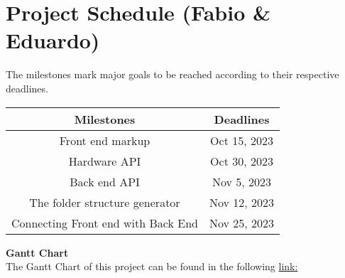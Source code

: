  \section{Project Schedule (Fabio \& Eduardo)}
 The milestones mark major goals to be reached according to their respective deadlines.
\begin{table}[H]
    \centering
    \begin{tabular}{||c | c||} 
        \hline
        Milestones & Deadlines\\
        \hline
        Front end markup & Oct 15, 2023\\
        \hline
        Hardware API & Oct 30, 2023\\
        \hline
        Back end API & Nov 5, 2023\\
        \hline
        The folder structure generator & Nov 12, 2023\\
        \hline
        Connecting Front end with Back End & Nov 25, 2023\\
        \hline
    \end{tabular}
\end{table}
\textbf{Gantt Chart}\\
The Gantt Chart of this project can be found in the following \href{www.google.com}{link:}